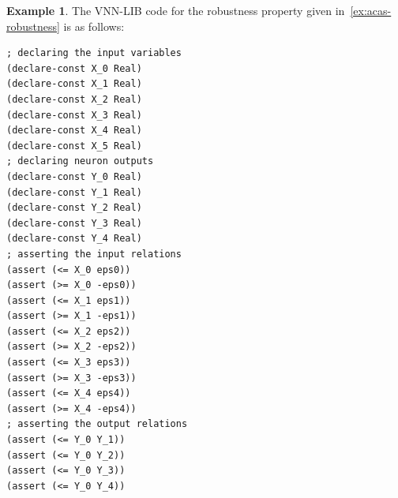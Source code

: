 \documentclass[oneside,11pt,dvipsnames]{book}
\numberwithin{equation}{section}
\theoremstyle{definition}
\newtheorem{example}{Example}[section]
\theoremstyle{remark}
\newcommand{\tvn}[1]{\iftoggle{usecomment}{{\color{red}{[TVN]: #1}}}{}}
\newcommand{\hd}[1]{\iftoggle{usecomment}{{\color{blue}{[HD]: #1}}}{}}
\begin{document}
\begin{example}




The VNN-LIB code for the robustness property given in~\autoref{ex:acas-robustness} is as follows:

\begin{lstlisting}[style=SMTLIB-style, language=SMTLIB,basicstyle=\ttfamily\scriptsize, multicols=2]
; declaring the input variables
(declare-const X_0 Real)
(declare-const X_1 Real)
(declare-const X_2 Real)
(declare-const X_3 Real)
(declare-const X_4 Real)
(declare-const X_5 Real)
; declaring neuron outputs
(declare-const Y_0 Real)
(declare-const Y_1 Real)
(declare-const Y_2 Real)
(declare-const Y_3 Real)
(declare-const Y_4 Real)
; asserting the input relations
(assert (<= X_0 eps0))
(assert (>= X_0 -eps0))
(assert (<= X_1 eps1))
(assert (>= X_1 -eps1))
(assert (<= X_2 eps2))
(assert (>= X_2 -eps2))
(assert (<= X_3 eps3))
(assert (>= X_3 -eps3))
(assert (<= X_4 eps4))
(assert (>= X_4 -eps4))
; asserting the output relations
(assert (<= Y_0 Y_1))
(assert (<= Y_0 Y_2))
(assert (<= Y_0 Y_3))
(assert (<= Y_0 Y_4))
\end{lstlisting}
\end{example}






\end{document}
